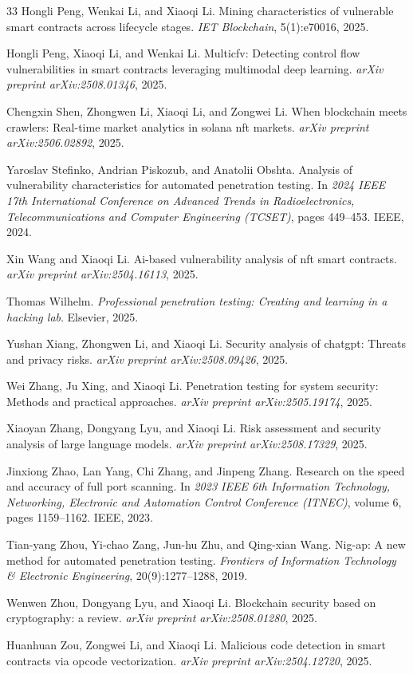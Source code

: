 \documentclass[conference]{IEEEtran}
\begin{document}
\begin{thebibliography}{33}
Hongli Peng, Wenkai Li, and Xiaoqi Li. 
Mining characteristics of vulnerable smart contracts across lifecycle stages. 
\emph{IET Blockchain}, 5(1):e70016, 2025.

Hongli Peng, Xiaoqi Li, and Wenkai Li. 
Multicfv: Detecting control flow vulnerabilities in smart contracts leveraging multimodal deep learning. 
\emph{arXiv preprint arXiv:2508.01346}, 2025.

Chengxin Shen, Zhongwen Li, Xiaoqi Li, and Zongwei Li. 
When blockchain meets crawlers: Real-time market analytics in solana nft markets. 
\emph{arXiv preprint arXiv:2506.02892}, 2025.

Yaroslav Stefinko, Andrian Piskozub, and Anatolii Obshta. 
Analysis of vulnerability characteristics for automated penetration testing. 
In \emph{2024 IEEE 17th International Conference on Advanced Trends in Radioelectronics, Telecommunications and Computer Engineering (TCSET)}, pages 449--453. IEEE, 2024.

Xin Wang and Xiaoqi Li. 
Ai-based vulnerability analysis of nft smart contracts. 
\emph{arXiv preprint arXiv:2504.16113}, 2025.

Thomas Wilhelm. 
\emph{Professional penetration testing: Creating and learning in a hacking lab}. Elsevier, 2025.

Yushan Xiang, Zhongwen Li, and Xiaoqi Li. 
Security analysis of chatgpt: Threats and privacy risks. 
\emph{arXiv preprint arXiv:2508.09426}, 2025.

Wei Zhang, Ju Xing, and Xiaoqi Li. 
Penetration testing for system security: Methods and practical approaches. 
\emph{arXiv preprint arXiv:2505.19174}, 2025.

Xiaoyan Zhang, Dongyang Lyu, and Xiaoqi Li. 
Risk assessment and security analysis of large language models. 
\emph{arXiv preprint arXiv:2508.17329}, 2025.

Jinxiong Zhao, Lan Yang, Chi Zhang, and Jinpeng Zhang. 
Research on the speed and accuracy of full port scanning. 
In \emph{2023 IEEE 6th Information Technology, Networking, Electronic and Automation Control Conference (ITNEC)}, volume 6, pages 1159--1162. IEEE, 2023.

Tian-yang Zhou, Yi-chao Zang, Jun-hu Zhu, and Qing-xian Wang. 
Nig-ap: A new method for automated penetration testing. 
\emph{Frontiers of Information Technology \& Electronic Engineering}, 20(9):1277--1288, 2019.

Wenwen Zhou, Dongyang Lyu, and Xiaoqi Li. 
Blockchain security based on cryptography: a review. 
\emph{arXiv preprint arXiv:2508.01280}, 2025.

Huanhuan Zou, Zongwei Li, and Xiaoqi Li. 
Malicious code detection in smart contracts via opcode vectorization. 
\emph{arXiv preprint arXiv:2504.12720}, 2025.

\end{thebibliography}
\end{document}
